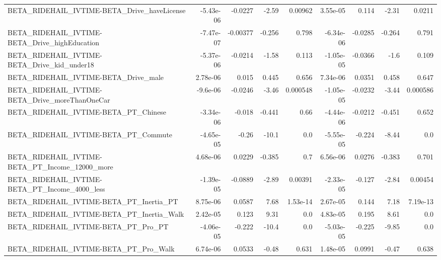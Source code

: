 \begin{tabular}{lrrrrrrrr}
BETA\_RIDEHAIL\_IVTIME-BETA\_Drive\_haveLicense        &   -5.43e-06 &      -0.0227 &    -2.59 &  0.00962 &   3.55e-05 &       0.114 &        -2.31 &        0.0211 \\
BETA\_RIDEHAIL\_IVTIME-BETA\_Drive\_highEducation      &   -7.47e-07 &     -0.00377 &   -0.256 &    0.798 &  -6.34e-06 &     -0.0285 &       -0.264 &         0.791 \\
BETA\_RIDEHAIL\_IVTIME-BETA\_Drive\_kid\_under18        &   -5.37e-06 &      -0.0214 &    -1.58 &    0.113 &  -1.05e-05 &     -0.0366 &         -1.6 &         0.109 \\
BETA\_RIDEHAIL\_IVTIME-BETA\_Drive\_male               &    2.78e-06 &        0.015 &    0.445 &    0.656 &   7.34e-06 &      0.0351 &        0.458 &         0.647 \\
BETA\_RIDEHAIL\_IVTIME-BETA\_Drive\_moreThanOneCar     &    -9.6e-06 &      -0.0246 &    -3.46 & 0.000548 &  -1.05e-05 &     -0.0232 &        -3.44 &      0.000586 \\
BETA\_RIDEHAIL\_IVTIME-BETA\_PT\_Chinese               &   -3.34e-06 &       -0.018 &   -0.441 &     0.66 &  -4.44e-06 &     -0.0212 &       -0.451 &         0.652 \\
BETA\_RIDEHAIL\_IVTIME-BETA\_PT\_Commute               &   -4.65e-05 &        -0.26 &    -10.1 &      0.0 &  -5.55e-05 &      -0.224 &        -8.44 &           0.0 \\
BETA\_RIDEHAIL\_IVTIME-BETA\_PT\_Income\_12000\_more     &    4.68e-06 &       0.0229 &   -0.385 &      0.7 &   6.56e-06 &      0.0276 &       -0.383 &         0.701 \\
BETA\_RIDEHAIL\_IVTIME-BETA\_PT\_Income\_4000\_less      &   -1.39e-05 &      -0.0889 &    -2.89 &  0.00391 &  -2.33e-05 &      -0.127 &        -2.84 &       0.00454 \\
BETA\_RIDEHAIL\_IVTIME-BETA\_PT\_Inertia\_PT            &    8.75e-06 &       0.0587 &     7.68 & 1.53e-14 &   2.67e-05 &       0.144 &         7.18 &      7.19e-13 \\
BETA\_RIDEHAIL\_IVTIME-BETA\_PT\_Inertia\_Walk          &    2.42e-05 &        0.123 &     9.31 &      0.0 &   4.83e-05 &       0.195 &         8.61 &           0.0 \\
BETA\_RIDEHAIL\_IVTIME-BETA\_PT\_Pro\_PT                &   -4.06e-05 &       -0.222 &    -10.4 &      0.0 &  -5.03e-05 &      -0.225 &        -9.85 &           0.0 \\
BETA\_RIDEHAIL\_IVTIME-BETA\_PT\_Pro\_Walk              &    6.74e-06 &       0.0533 &    -0.48 &    0.631 &   1.48e-05 &      0.0991 &        -0.47 &         0.638 \\

\end{tabular}
